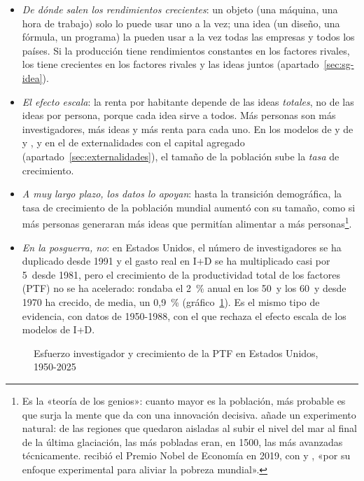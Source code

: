 \documentclass[11pt]{article}
\begin{document}
\begin{itemize}
\item \emph{De dónde salen los rendimientos crecientes}: un objeto (una máquina, una hora de trabajo) solo lo puede usar uno a la vez; una idea (un diseño, una fórmula, un programa) la pueden usar a la vez todas las empresas y todos los países. Si la producción tiene rendimientos constantes en los factores rivales, los tiene crecientes en los factores rivales y las ideas juntos (apartado~\ref{sec:sg-idea})\nocite{Romer1990,Jones2005Growth}.
\item \emph{El efecto escala}: la renta por habitante depende de las ideas \emph{totales}, no de las ideas por persona, porque cada idea sirve a todos. Más personas son más investigadores, más ideas y más renta para cada uno. En los modelos de  y de  y , y en el de externalidades con el capital agregado (apartado~\ref{sec:externalidades}), el tamaño de la población sube la \emph{tasa} de crecimiento.
\item \emph{A muy largo plazo, los datos lo apoyan}\nocite{Kremer1993}: hasta la transición demográfica, la tasa de crecimiento de la población mundial aumentó con su tamaño, como si más personas generaran más ideas que permitían alimentar a más personas\footnote{Es la «teoría de los genios»: cuanto mayor es la población, más probable es que surja la mente que da con una innovación decisiva. \textcite{Kremer1993} añade un experimento natural: de las regiones que quedaron aisladas al subir el nivel del mar al final de la última glaciación, las más pobladas eran, en 1500, las más avanzadas técnicamente.  recibió el Premio Nobel de Economía en 2019, con  y , «por su enfoque experimental para aliviar la pobreza mundial»\nocite{NobelPrize2019}.}.
\item \emph{En la posguerra, no}: en Estados Unidos, el número de investigadores se ha duplicado desde 1991 y el gasto real en I+D se ha multiplicado casi por 5~desde 1981, pero el crecimiento de la productividad total de los factores (PTF) no se ha acelerado: rondaba el 2~\% anual en los 50~y los 60~y desde 1970 ha crecido, de media, un 0,9~\% (gráfico~\ref{fig:efecto-escala})\nocite{FRBSF2026PTF,OCDE2026MSTI}. Es el mismo tipo de evidencia, con datos de 1950-1988, con el que \textcite{Jones1995} rechaza el efecto escala de los modelos de I+D.
\end{itemize}

\begin{figure}[H]
\centering
\caption{Esfuerzo investigador y crecimiento de la PTF en Estados Unidos, 1950-2025}\label{fig:efecto-escala}
\end{figure}
\end{document}

